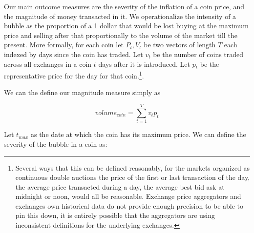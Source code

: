 Our main outcome measures are the severity of the inflation of a coin price, and the magnitude of money transacted in it.
We operationalize the intensity of a bubble as the proportion of a 1 dollar that would be lost buying at the maximum price and selling after that proportionally to the volume of the market till the present.
More formally, for each coin let $P_t,V_t$ be two vectors of length $T$ each indexed by days since the coin has traded.
Let $v_t$ be the number of coins traded across all exchanges in a coin $t$ days after it is introduced. 
Let $p_t$ be the representative price for the day for that coin.\footnote{ Several ways that this can be defined reasonably, for the markets organized as continuous double auctions the price of the first or last transaction of the day,  the average price transacted during a day, the average best bid ask at midnight or noon, would all be reasonable. Exchange price aggregators and exchanges own historical data do not provide enough precision to be able to pin this down, it is entirely possible that the aggregators are using inconsistent definitions for the underlying exchanges.   }. 

We can the define our magnitude measure simply as

\begin{equation}
volume_{coin} = \sum_{t=1}^{T} v_t  p_t
\end{equation}

Let $t_{max}$ as the date at which the coin has its maximum price.  
We can define the severity of the bubble in a coin as:

